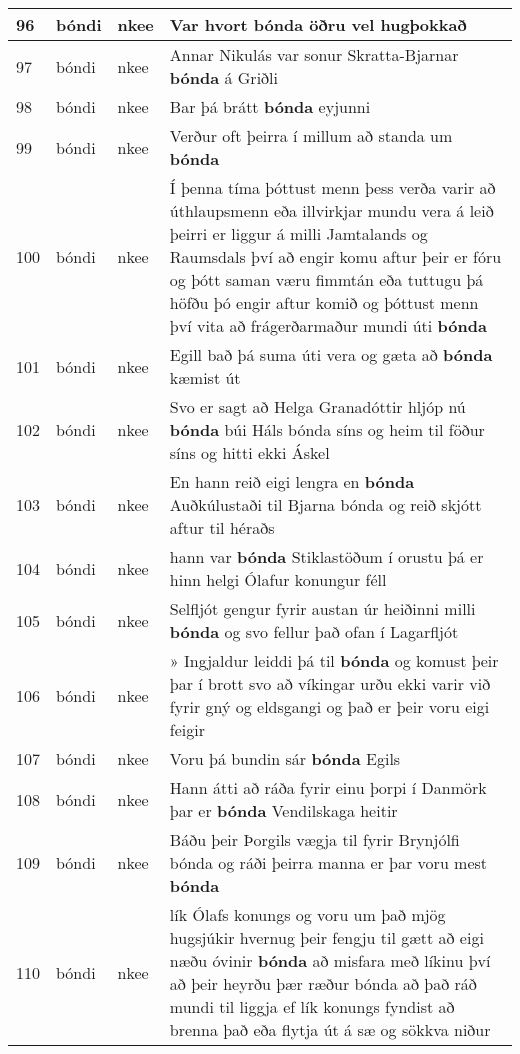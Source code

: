 \documentclass{article}
\begin{document}
\begin{longtable}{p{1cm}|p{1cm}|p{1cm}|p{13cm}}
\hline
96&bóndi&nkee&Var hvort \textbf{bónda} öðru vel hugþokkað\\
\hline
97&bóndi&nkee&Annar Nikulás var sonur Skratta-Bjarnar \textbf{bónda} á Griðli\\
\hline
98&bóndi&nkee&Bar þá brátt \textbf{bónda} eyjunni\\
\hline
99&bóndi&nkee&Verður oft þeirra í millum að standa um \textbf{bónda} \\
\hline
100&bóndi&nkee&Í þenna tíma þóttust menn þess verða varir að úthlaupsmenn eða illvirkjar mundu vera á leið þeirri er liggur á milli Jamtalands og Raumsdals því að engir komu aftur þeir er fóru og þótt saman væru fimmtán eða tuttugu þá höfðu þó engir aftur komið og þóttust menn því vita að frágerðarmaður mundi úti \textbf{bónda} \\
\hline
101&bóndi&nkee&Egill bað þá suma úti vera og gæta að \textbf{bónda} kæmist út\\
\hline
102&bóndi&nkee&Svo er sagt að Helga Granadóttir hljóp nú \textbf{bónda} búi Háls bónda síns og heim til föður síns og hitti ekki Áskel\\
\hline
103&bóndi&nkee&En hann reið eigi lengra en \textbf{bónda} Auðkúlustaði til Bjarna bónda og reið skjótt aftur til héraðs\\
\hline
104&bóndi&nkee&hann var \textbf{bónda} Stiklastöðum í orustu þá er hinn helgi Ólafur konungur féll\\
\hline
105&bóndi&nkee&Selfljót gengur fyrir austan úr heiðinni milli \textbf{bónda} og svo fellur það ofan í Lagarfljót\\
\hline
106&bóndi&nkee&» Ingjaldur leiddi þá til \textbf{bónda} og komust þeir þar í brott svo að víkingar urðu ekki varir við fyrir gný og eldsgangi og það er þeir voru eigi feigir\\
\hline
107&bóndi&nkee&Voru þá bundin sár \textbf{bónda} Egils\\
\hline
108&bóndi&nkee&Hann átti að ráða fyrir einu þorpi í Danmörk þar er \textbf{bónda} Vendilskaga heitir\\
\hline
109&bóndi&nkee&Báðu þeir Þorgils vægja til fyrir Brynjólfi bónda og ráði þeirra manna er þar voru mest \textbf{bónda} \\
\hline
110&bóndi&nkee&lík Ólafs konungs og voru um það mjög hugsjúkir hvernug þeir fengju til gætt að eigi næðu óvinir \textbf{bónda} að misfara með líkinu því að þeir heyrðu þær ræður bónda að það ráð mundi til liggja ef lík konungs fyndist að brenna það eða flytja út á sæ og sökkva niður\\

\end{longtable}
\end{document}
